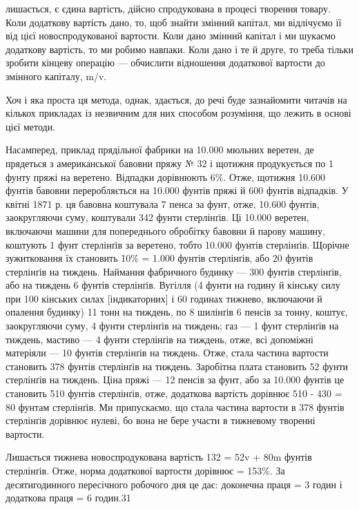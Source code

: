 лишається, є єдина вартість, дійсно спродукована в процесі творення товару. Коли додаткову вартість
дано, то, щоб знайти змінний капітал, ми відлічуємо її від цієї новоспродукованої вартости.
Коли дано змінний капітал і ми шукаємо додаткову вартість, то ми робимо навпаки. Коли дано і те й
друге, то треба тільки зробити кінцеву операцію — обчислити відношення додаткової вартости до
змінного капіталу, m/v.

Хоч і яка проста ця метода, однак, здається, до речі буде зазнайомити читачів на кількох прикладах
із незвичним для них
способом розуміння, що лежить в основі цієї методи.

Насамперед, приклад прядільної фабрики на 10.000 мюльних веретен, де прядеться з американської
бавовни пряжу № 32 і
щотижня продукується по 1 фунту пряжі на веретено. Відпадки дорівнюють 6\%. Отже, щотижня 10.600
фунтів бавовни переробляється на 10.000 фунтів пряжі й 600 фунтів відпадків. У квітні 1871 р. ця
бавовна коштувала 7 пенса за фунт, отже, 10.600 фунтів, заокругляючи суму, коштували 342 фунти
стерлінґів. Ці 10.000
веретен, включаючи машини для попереднього обробітку бавовни й парову машину, коштують 1 фунт
стерлінґів за веретено, тобто 10.000 фунтів стерлінґів. Щорічне зужитковання їх становить
10\% = 1.000 фунтів стерлінґів, або 20 фунтів стерлінґів на тиждень. Наймання фабричного будинку —
300 фунтів стерлінґів, або на тиждень 6 фунтів стерлінґів. Вугілля (4 фунти на годину
й кінську силу при 100 кінських силах [індикаторних] і 60 годинах тижнево, включаючи й опалення
будинку) 11 тонн
на тиждень, по 8 шилінґів 6 пенсів за тонну, коштує, заокругляючи суму, 4 фунти стерлінґів на
тиждень; газ — 1 фунт стерлінґів на тиждень, мастиво — 4 фунти стерлінґів на тиждень, отже, всі
допоміжні матеріяли — 10 фунтів стерлінґів на тиждень. Отже, стала частина вартости становить 378
фунтів стерлінґів
на тиждень. Заробітна плата становить 52 фунти стерлінґів на тиждень. Ціна пряжі — 12 пенсів за
фунт, або за 10.000 фунтів
це становить 510 фунтів стерлінґів, отже, додаткова вартість дорівнює 510 - 430 = 80 фунтам
стерлінґів. Ми припускаємо, що стала частина вартости в 378 фунтів стерлінґів дорівнює нулеві, бо
вона не бере участи в тижневому творенні вартости.

Лишається тижнева новоспродукована вартість 132 = 52v + 80m фунтів стерлінґів. Отже, норма
додаткової вартости дорівнює
 = 153\%. За десятигодинного пересічного робочого дня це дає: доконечна праця = 3
годин і додаткова праця = 6 годин.31